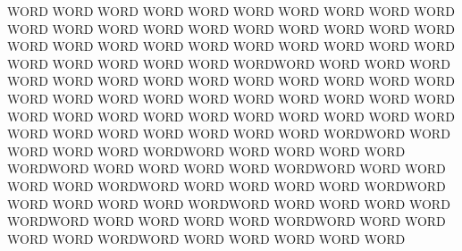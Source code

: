 



WORD WORD WORD WORD WORD WORD WORD WORD WORD WORD WORD WORD WORD WORD WORD WORD WORD WORD WORD WORD WORD WORD WORD WORD WORD WORD WORD WORD WORD WORD WORD WORD WORD WORD WORD WORDWORD WORD WORD WORD WORD WORD WORD WORD WORD WORD WORD WORD WORD WORD WORD WORD WORD WORD WORD WORD WORD WORD WORD WORD WORD WORD WORD WORD WORD WORD WORD WORD WORD WORD WORD WORD WORD WORD WORD WORD WORD WORDWORD WORD WORD WORD WORD WORDWORD WORD WORD WORD WORD WORDWORD WORD WORD WORD WORD WORDWORD WORD WORD WORD WORD WORDWORD WORD WORD WORD WORD WORDWORD WORD WORD WORD WORD WORDWORD WORD WORD WORD WORD WORDWORD WORD WORD WORD WORD WORDWORD WORD WORD WORD WORD WORDWORD WORD WORD WORD WORD WORD